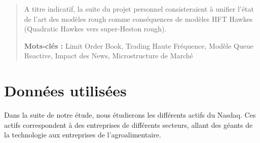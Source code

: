 \documentclass[10pt,a4paper]{article}
\theoremstyle{definition}
\theoremstyle{remark}
\begin{document}
\begin{titlepage}
\begin{center}
\begin{minipage}{0.8\textwidth}
\begin{abstract}
    A titre indicatif, la suite du projet personnel consisteraient à unifier l'état de l'art des modèles rough comme conséquences de modèles HFT Hawkes (Quadratic Hawkes vers super-Heston rough).

            \vspace{0.5cm}
    \textbf{Mots-clés :} Limit Order Book, Trading Haute Fréquence, Modèle Queue Reactive, Impact des News, Microstructure de Marché
\end{abstract}
            \end{minipage}

            \vfill
            
            
        \end{center}
    \end{titlepage}

    \newpage
    \tableofcontents
    \thispagestyle{empty}

    \newpage
    \setcounter{page}{1}
    
    
\section{Données utilisées}
Dans la suite de notre étude, nous étudierons les différents actifs du Nasdaq. Ces actifs correspondent à des entreprises de différents secteurs, allant des géants de la technologie aux entreprises de l'agroalimentaire.
\end{document}
